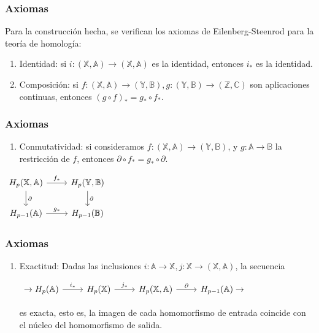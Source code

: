 \documentclass{beamer}
\def\X{{\mathbb X}}
\def\A{{\mathbb A}}
\def\Y{{\mathbb Y}}
\def\B{{\mathbb B}}
\def\Z{{\mathbb Z}}
\def\C{{\mathbb C}}
\newcounter{saveenumi}
\newcommand{\seti}{\setcounter{saveenumi}{\value{enumi}}}
\newcommand{\conti}{\setcounter{enumi}{\value{saveenumi}}}
\begin{document}
\begin{frame}
    \frametitle{Axiomas}
    Para la construcción hecha, se verifican los axiomas de Eilenberg-Steenrod para la teoría de homología:
    \begin{enumerate}
      \item Identidad: si $i \colon (\X, \A) \to (\X, \A)$ es la identidad, entonces $i_*$ es la identidad.
      \item Composición: si $f \colon (\X, \A) \to (\Y, \B), g \colon (\Y, \B) \to (\Z, \C)$ son aplicaciones continuas,
            entonces $(g \circ f)_* = g_* \circ f_*$.
    \seti

    \end{enumerate}

\end{frame}

\begin{frame}[fragile]
  \frametitle{Axiomas}
  \begin{enumerate}
    \conti
    \item Conmutatividad: si consideramos $f \colon (\X, \A) \to (\Y, \B)$, y $g \colon \A \to \B$ la restricción de $f$,
          entonces $\partial \circ f_* = g_* \circ \partial$.
    \seti
    \end{enumerate}
    \begin{center}
      $ \begin{tikzcd}
        H_p(\X, \A) \arrow{r}{f_*} \arrow{d}{\partial} & H_p(\Y, \B) \arrow{d}{\partial} \\
        H_{p-1}(\A) \arrow{r}{g_*} & H_{p-1}(\B)
      \end{tikzcd} $
    \end{center}

\end{frame}


\begin{frame}[fragile]
  \frametitle{Axiomas}
  \begin{enumerate}
    \conti
    \item Exactitud: Dadas las inclusiones $i \colon \A \to \X, j \colon \X \to (\X, \A)$, la secuencia
    \begin{center}
      $ \begin{tikzcd}
        \to H_p(\A) \arrow{r}{i_*} & H_p(\X) \arrow{r}{j_*} & H_p(\X, \A) \arrow{r}{\partial} & H_{p-1}(\A) \to
      \end{tikzcd} $
    \end{center}
    es exacta, esto es, la imagen de cada homomorfismo de entrada coincide con el núcleo del homomorfismo de salida.
    \seti
  \end{enumerate}
\end{frame}
\end{document}
